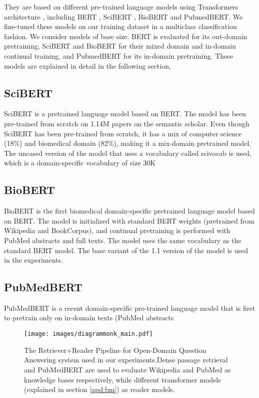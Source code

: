 \documentclass[pmlr,twocolumn,10pt]{jmlr}
\begin{document}
They are based on different pre-trained language models using Transformers architecture \citep{NIPS2017_3f5ee243} , including BERT \citep{Devlin2019} , SciBERT \citep{Beltagy2019}, BioBERT \citep{c99d46c12d234e77957c3d847b64f5cf} and PubmedBERT\citep{Gu2020}. We fine-tuned these models on our training dataset in a multiclass classification fashion. We consider models of base size. BERT is evaluated for its out-domain pretraining, SciBERT and BioBERT for their mixed domain and in-domain continual training, and PubmedBERT for its in-domain pretraining. These models are explained in detail in the following section,


\subsection{SciBERT}
SciBERT \citep{Beltagy2019} is a pretrained language model based on BERT. The model has been pre-trained from scratch on 1.14M papers on the semantic scholar. Even though SciBERT has been pre-trained from scratch, it has a mix of computer science (18\%) and biomedical domain (82\%), making it a mix-domain pretrained model. The uncased version of the model that uses a vocabulary called scivocab is used, which is a domain-specific vocabulary of size 30K

\subsection{BioBERT}
BioBERT \citep{c99d46c12d234e77957c3d847b64f5cf} is the first biomedical domain-specific pretrained language model based on BERT. The model is initialized with standard BERT weights  (pretrained from Wikipedia and BookCorpus), and continual pretraining is performed with PubMed abstracts and full texts. The model uses the same vocabulary as the standard BERT model. The base variant of the 1.1 version of the model is used in the experiments.
\subsection{PubMedBERT}
PubMedBERT \citep{Gu2020} is a recent domain-specific pre-trained language model that is first to pretrain only on in-domain texts (PubMed abstracts 


\begin{figure*}
 \centering
  \texttt{[image: images/diagrammonk\_main.pdf]}
  \caption{ \footnotesize The Retriever+Reader Pipeline for Open-Domain Question Answering system used in our experiments.Dense passage retrieval \citep{karpukhin2020dense} and PubMedBERT \citep{Gu2020} are used to evaluate Wikipedia and PubMed as knowledge bases respectively, while different transformer models (explained in section \ref{apd:bm}) as reader models.}
  \label{fig:open_domain}
\end{figure*}
\end{document}
